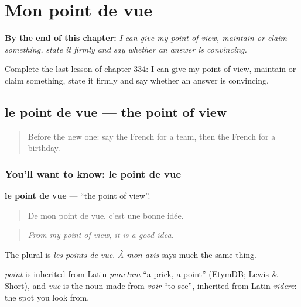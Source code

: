 
\chapter{Mon point de vue}
\label{ch:fr-mon-point-de-vue}

\begin{chapteropening}
\textbf{By the end of this chapter:} \emph{I can give my point of view, maintain or claim something, state it firmly and say whether an answer is convincing.}

Complete the last lesson of chapter 334: I can give my point of view, maintain or claim something, state it firmly and say whether an answer is convincing.
\end{chapteropening}

\section[le point de vue]{le point de vue — the point of view}

\label{lesson:FR-C334-point-de-vue}



\begin{quote}
Before the new one: say the French for a team, then the French for a birthday.
\end{quote}

\subsection*{You'll want to know: le point de vue}
\textbf{le point de vue} — \textquotedblleft{}the point of view\textquotedblright{}.

\begin{quote}
De mon point de vue, c'est une bonne idée.
\end{quote}

\begin{quote}
\emph{From my point of view, it is a good idea.}
\end{quote}

The plural is \emph{les points de vue}. \emph{À mon avis} says much the same thing.

\begin{cousinweb}
\emph{point} is inherited from Latin \emph{punctum} \textquotedblleft{}a prick, a point\textquotedblright{} (EtymDB; Lewis \& Short), and \emph{vue} is the noun made from \emph{voir} \textquotedblleft{}to see\textquotedblright{}, inherited from Latin \emph{vidēre}: the spot you look from.
\end{cousinweb}

